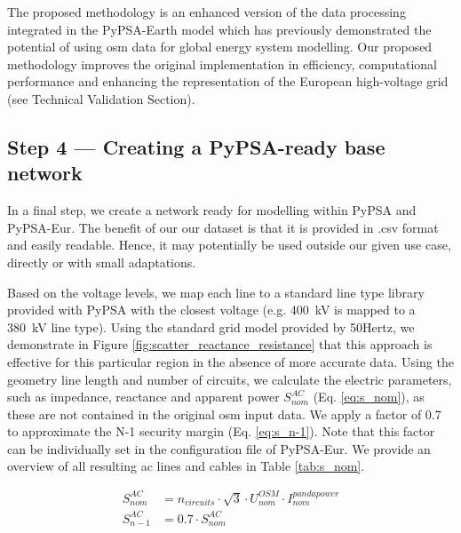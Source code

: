 \documentclass[fleqn,10pt]{wlscirep}
\let\autocite\cite
\begin{document}
The proposed methodology is an enhanced version of the data processing integrated in the PyPSA-Earth model \autocite{parzenPyPSAEarthNewGlobal2023} which has previously demonstrated the potential of using \acrshort{osm} data for global energy system modelling. Our proposed methodology improves the original implementation in efficiency, computational performance and enhancing the representation of the European high-voltage grid (see Technical Validation Section).

\subsection*{Step 4 --- Creating a PyPSA-ready base network}
In a final step, we create a network ready for modelling within PyPSA and PyPSA-Eur. The benefit of our our dataset is that it is provided in .csv format and easily readable. Hence, it may potentially be used outside our given use case, directly or with small adaptations. 

Based on the voltage levels, we map each line to a standard line type library provided with PyPSA \autocite{brownPyPSAPythonPower2018,horschPyPSAEurOpenOptimisation2018,oedingElektrischeKraftwerkeUnd2016,thurnerPandapowerOpenSourcePython2018} with the closest voltage (e.g. \SI{400}{\kilo\volt} is mapped to a \SI{380}{\kilo\volt} line type). Using the standard grid model provided by 50Hertz, \autocite{50hertzStaticGridModel2022} we demonstrate in Figure \ref{fig:scatter_reactance_resistance} that this approach is effective for this particular region in the absence of more accurate data. Using the geometry line length and number of circuits, we calculate the electric parameters, such as impedance, reactance and apparent power $S_{nom}^{AC}$ (Eq. \ref{eq:s_nom}), as these are not contained in the original \gls{osm} input data. We apply a factor of 0.7 to approximate the N-1 security margin (Eq. \ref{eq:s_n-1}). \autocite{shokrigazafroudiTopologybasedApproximationsContingency2022,horschPyPSAEurOpenOptimisation2018} Note that this factor can be individually set in the configuration file of PyPSA-Eur. We provide an overview of all resulting \acrshort{ac} lines and cables in Table \ref{tab:s_nom}.

\begin{align}
    S_{nom}^{AC} &= n_{circuits}\cdot\sqrt{3}\cdot U_{nom}^{OSM} \cdot I_{nom}^
    {pandapower} \label{eq:s_nom} \\
    S_{n-1}^{AC} &= 0.7 \cdot S_{nom}^{AC} \label{eq:s_n-1}
\end{align}
\end{document}
